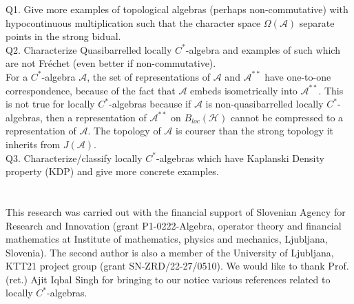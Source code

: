 \documentclass[10pt]{article}
\theoremstyle{definition}
\begin{document}
	\noindent	Q1. Give more examples of topological algebras (perhaps non-commutative) with hypocontinuous multiplication such that the character space $\Omega(\mathcal A)$ separate points in the strong bidual.\\
		
	\noindent	Q2. Characterize Quasibarrelled locally $C^*$-algebra and examples of such which are not Fr\'echet (even better if non-commutative).\\
	
	For a $C^*$-algebra $\mathcal A$, the set of representations of $\mathcal A$ and $\mathcal A^{**}$ have one-to-one correspondence, because of the fact that $\mathcal A$ embeds isometrically into $\mathcal A^{**}$. This is not true for locally $C^*$-algebras because if $\mathcal A$ is non-quasibarrelled locally $C^*$-algebras, then a representation of $\mathcal A^{**}$ on $B_{loc}(\mathcal H)$ cannot be compressed to a representation of $\mathcal A$. The topology of $\mathcal A$ is courser than the strong topology it inherits from $J(\mathcal A)$.\\
	
	\noindent Q3. Characterize/classify locally $C^*$-algebras which have Kaplanski Density property (KDP) and give more concrete examples.\\
	~\\~\\
	 This research was carried out with the financial support of Slovenian
	Agency for Research and Innovation (grant P1-0222-Algebra, operator theory and financial
	mathematics at Institute of mathematics, physics and mechanics, Ljubljana, Slovenia).
	The second author is also a member of the University of Ljubljana, KTT21 project
	group (grant SN-ZRD/22-27/0510). We would like to thank Prof.(ret.) Ajit Iqbal Singh for bringing to our notice various references related  to locally $C^*$-algebras.
	
\end{document}
